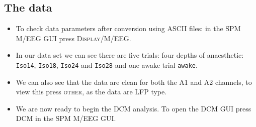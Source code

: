 \subsection{The data}

\begin{itemize}
\item To check data parameters after conversion using ASCII files: in the SPM M/EEG GUI press \textsc{Display/M/EEG}.
\item In our data set we can see there are five trials: four depths of anaesthetic: \texttt{Iso14}, \texttt{Iso18}, \texttt{Iso24} and \texttt{Iso28} and one awake trial \texttt{awake}.
\item We can also see that the data are clean for both the A1 and A2 channels, to view this press \textsc{other}, as the data are LFP type.
\item We are now ready to begin the DCM analysis. To open the DCM GUI press \textsc{DCM} in the SPM M/EEG GUI.
\end{itemize}

